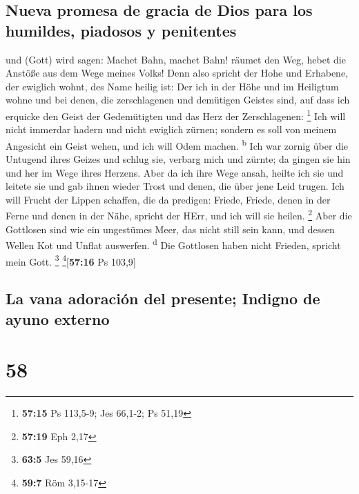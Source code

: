 \hypertarget{nueva-promesa-de-gracia-de-dios-para-los-humildes-piadosos-y-penitentes}{%
\subsection{Nueva promesa de gracia de Dios para los humildes, piadosos
y
penitentes}\label{nueva-promesa-de-gracia-de-dios-para-los-humildes-piadosos-y-penitentes}}

 und (Gott) wird sagen: Machet Bahn, machet Bahn! räumet
den Weg, hebet die Anstöße aus dem Wege meines Volks! 
Denn also spricht der Hohe und Erhabene, der ewiglich wohnt, des Name
heilig ist: Der ich in der Höhe und im Heiligtum wohne und bei denen,
die zerschlagenen und demütigen Geistes sind, auf dass ich erquicke den
Geist der Gedemütigten und das Herz der Zerschlagenen: \footnote{\textbf{57:15}
  Ps 113,5-9; Jes 66,1-2; Ps 51,19}  Ich will nicht
immerdar hadern und nicht ewiglich zürnen; sondern es soll von meinem
Angesicht ein Geist wehen, und ich will Odem machen. \textsuperscript{b}
 Ich war zornig über die Untugend ihres Geizes und schlug
sie, verbarg mich und zürnte; da gingen sie hin und her im Wege ihres
Herzens.  Aber da ich ihre Wege ansah, heilte ich sie und
leitete sie und gab ihnen wieder Trost und denen, die über jene Leid
trugen.  Ich will Frucht der Lippen schaffen, die da
predigen: Friede, Friede, denen in der Ferne und denen in der Nähe,
spricht der HErr, und ich will sie heilen. \footnote{\textbf{57:19} Eph
  2,17}  Aber die Gottlosen sind wie ein ungestümes Meer,
das nicht still sein kann, und dessen Wellen Kot und Unflat auswerfen.
\textsuperscript{d}  Die Gottlosen haben nicht Frieden,
spricht mein Gott. \footnote{\textbf{63:5} Jes 59,16}
\footnote{\textbf{59:7} Röm 3,15-17}{[}\textbf{57:16} Ps 103,9{]}

\hypertarget{la-vana-adoraciuxf3n-del-presente-indigno-de-ayuno-externo}{%
\subsection{La vana adoración del presente; Indigno de ayuno
externo}\label{la-vana-adoraciuxf3n-del-presente-indigno-de-ayuno-externo}}

\hypertarget{section-57}{%
\section{58}\label{section-57}}

